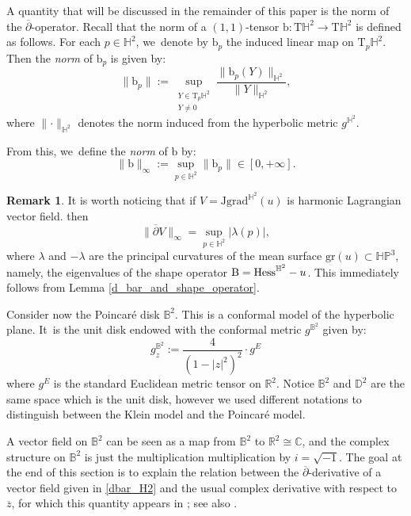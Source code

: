 \documentclass[11pt]{article}
\makeatletter
\DeclareRobustCommand{\mathbbm}[1]{\csname jepbb@#1\endcsname}
\theoremstyle{plain}
\theoremstyle{definition}
\newtheorem{remark}[cor]{Remark}
\newcommand{\bb}{\mathrm{b}}
\newcommand{\HP}{\mathbb{HP}^3}
\newcommand{\grad}{\mathrm{grad}^{\mathbb{H}^2}}
\newcommand{\hess}{\mathrm{Hess}^{\mathbb{H}^2}}
\newcommand{\J}{\mathrm{J}}
\newcommand{\B}{\mathrm{B}}
\makeatother
\begin{document}
A quantity that will be discussed in the remainder of this paper is the norm of the $\overline{\partial}$-operator. Recall that the norm of a $(1,1)$-tensor $\bb: \mathrm{T}\mathbb{H}^2 \to \mathrm{T}\mathbb{H}^2$ is defined as follows. For each $p \in \mathbb{H}^2$, we~denote by $\bb_p$ the induced linear map on $\mathrm{T}_p\mathbb{H}^2$. Then the \emph{norm} of $\bb_p$ is given by:
\begin{equation}\label{norme}
\lVert \bb_p \rVert := \sup_{\substack{Y\in\mathrm{T}_p\mathbb{H}^2\\Y\neq 0}} \frac{\lVert \bb_p(Y) \rVert_{\mathbb{H}^2}}{\lVert Y \rVert_{\mathbb{H}^2}},
\end{equation}
where $\lVert \cdot \rVert_{\mathbb{H}^2}$ denotes the norm induced from the hyperbolic metric $g^{\mathbb{H}^2}$.

From this, we~define the \emph{norm} of $\bb$ by:
\[
\lVert \bb \rVert_{\infty} := \sup_{p \in \mathbb{H}^2} \lVert \bb_p \rVert \in [0, +\infty].
\]

\begin{remark}\label{principal_curvature}
It is worth noticing that if $V=\J\grad(u)$ is harmonic Lagrangian vector field. then
\[
\lVert \overline{\partial}V\rVert_{\infty}=\sup_{p\in\mathbb{H}^2}\lvert\lambda(p)\rvert,
\]
where $\lambda$ and $-\lambda$ are the principal curvatures of the mean surface $\mathrm{gr}(u)\subset\HP$, namely, the eigenvalues of the shape operator $\B=\hess-u\mathbbm{1}$. This immediately follows from Lemma \ref{d_bar_and_shape_operator}.
\end{remark}

Consider now the Poincaré disk $\mathbb{B}^2$. This is a conformal model of the hyperbolic plane. It~is the unit disk endowed with the conformal metric $g^{\mathbb{B}^2}$ given by:
\[
g^{\mathbb{B}^2}_{z}:=\frac{4}{(1-\lvert z\rvert^2)^2}\cdot g^{E}
\]
where $g^E$ is the standard Euclidean metric tensor on $\mathbb{R}^2$. Notice $\mathbb{B}^2$ and $\mathbb{D}^2$ are the same space which is the unit disk, however we used different notations to distinguish between the Klein model and the Poincaré model.

A vector field on $\mathbb{B}^2$ can be seen as a map from $\mathbb{B}^2$ to $\mathbb{R}^2\cong\mathbb{C}$, and the complex structure on $\mathbb{B}^2$ is just the multiplication multiplication by $i=\sqrt{-1}$. The goal at the end of this section is to explain the relation between the $\overline{\partial}$-derivative of a vector field given in \eqref{dbar_H2} and the usual complex derivative with respect to $\overline{z}$, for which this quantity appears in \cite{Extension_with_bounded_derivative}; see also \cite{FanJun}.
\end{document}
